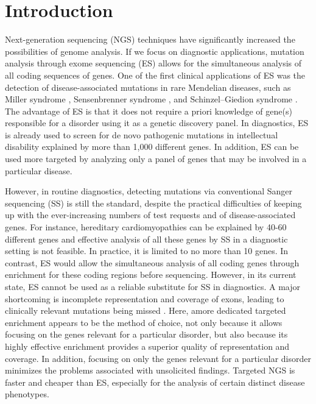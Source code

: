 \section{Introduction}\label{introduction}
Next-generation sequencing (NGS) techniques have significantly increased the possibilities of genome analysis. 
If we focus on diagnostic applications, mutation analysis through exome sequencing (ES) allows for the simultaneous analysis of all coding sequences of genes. 
One of the first clinical applications of ES was the detection of disease-associated mutations in rare Mendelian diseases, such as Miller syndrome \cite{Ng_2009}, Sensenbrenner syndrome \cite{Gilissen_2010}, and Schinzel–Giedion syndrome \cite{Hoischen_2010}. 
The advantage of ES is that it does not require a priori knowledge of gene(s) responsible for a disorder using it as a genetic discovery panel. 
In diagnostics, ES is already used to screen for de novo pathogenic mutations in intellectual disability \cite{de_Ligt_2012} explained by more than 1,000 different genes. 
In addition, ES can be used more targeted by analyzing only a panel of genes that may be involved in a particular disease. 

However, in routine diagnostics, detecting mutations via conventional Sanger sequencing (SS) is still the standard, despite the practical difficulties of keeping up with the ever-increasing numbers of test requests and of disease-associated genes. 
For instance, hereditary cardiomyopathies can be explained by 40-60 different genes \cite{Jongbloed_2010,Norton_2012} and effective analysis of all these genes by SS in a diagnostic setting is not feasible. 
In practice, it is limited to no more than 10 genes. 
In contrast, ES would allow the simultaneous analysis of all coding genes through enrichment for these coding regions before sequencing. 
However, in its current state, ES cannot be used as a reliable substitute for SS in diagnostics. 
A major shortcoming is incomplete representation and coverage of exons, leading to clinically relevant mutations being missed \cite{Gilissen_2010,Sulonen_2011}. 
Here, amore dedicated targeted enrichment appears to be the method of choice, not only because it allows focusing on the genes relevant for a particular disorder, but also because its highly effective enrichment provides a superior quality of representation and coverage. 
In addition, focusing on only the genes relevant for a particular disorder minimizes the problems associated with unsolicited findings. 
Targeted NGS is faster and cheaper than ES, especially for the analysis of certain distinct disease phenotypes. 


